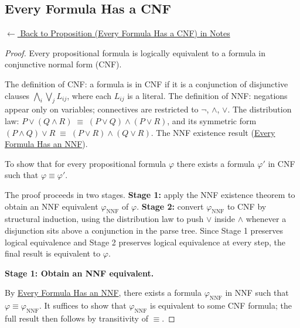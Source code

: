 
\subsection*{Every Formula Has a CNF}
\label{prf:cnf-exists}

\begin{remark*}[Return]
\hyperref[prop:cnf-exists]{$\leftarrow$ Back to Proposition (Every Formula Has a CNF) in Notes}
\end{remark*}

\begin{proof}
\Claim Every propositional formula is logically equivalent to a formula in conjunctive normal form (CNF).

\Given The definition of CNF: a formula is in CNF if it is a conjunction of
disjunctive clauses $\bigwedge_i \bigvee_j L_{ij}$, where each $L_{ij}$ is a
literal. The definition of NNF: negations appear only on variables; connectives
are restricted to $\neg$, $\wedge$, $\vee$. The distribution law:
$P \vee (Q \wedge R) \;\equiv\; (P \vee Q) \wedge (P \vee R)$, and its
symmetric form $(P \wedge Q) \vee R \;\equiv\; (P \vee R) \wedge (Q \vee R)$.
The NNF existence result (\hyperref[prop:nnf-exists]{Every Formula Has an NNF}).

\Goal To show that for every propositional formula $\varphi$ there exists a
formula $\varphi'$ in CNF such that $\varphi \equiv \varphi'$.

\Strategy The proof proceeds in two stages. \textbf{Stage 1:} apply the NNF
existence theorem to obtain an NNF equivalent $\varphi_{\mathrm{NNF}}$ of
$\varphi$. \textbf{Stage 2:} convert $\varphi_{\mathrm{NNF}}$ to CNF by
structural induction, using the distribution law to push $\vee$ inside $\wedge$
whenever a disjunction sits above a conjunction in the parse tree. Since Stage 1
preserves logical equivalence and Stage 2 preserves logical equivalence at every
step, the final result is equivalent to $\varphi$.

\medskip
\noindent\textbf{Stage 1: Obtain an NNF equivalent.}

By \hyperref[prop:nnf-exists]{Every Formula Has an NNF}, there exists a formula
$\varphi_{\mathrm{NNF}}$ in NNF such that $\varphi \equiv
\varphi_{\mathrm{NNF}}$. It suffices to show that $\varphi_{\mathrm{NNF}}$ is
equivalent to some CNF formula; the full result then follows by transitivity of
$\equiv$.


\end{proof}
